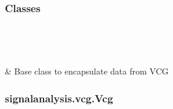 \documentclass[letterpaper,10pt,english]{sphinxmanual}
\begin{document}
\subsubsection*{Classes}


\begin{savenotes}\sphinxatlongtablestart\begin{longtable}[c]{}
\hline

\endfirsthead

%
{}\\
\hline

\endhead

\hline
{}\\
\endfoot

\endlastfoot

\sphinxAtStartPar
{\hyperref[\detokenize{_autosummary/signalanalysis.vcg.Vcg:signalanalysis.vcg.Vcg}]{}}
&
\sphinxAtStartPar
Base class to encapsulate data from VCG
\\
\hline
\end{longtable}\sphinxatlongtableend\end{savenotes}


\subsubsection{signalanalysis.vcg.Vcg}
\label{\detokenize{_autosummary/signalanalysis.vcg.Vcg:signalanalysis-vcg-vcg}}\label{\detokenize{_autosummary/signalanalysis.vcg.Vcg::doc}}
\end{document}
